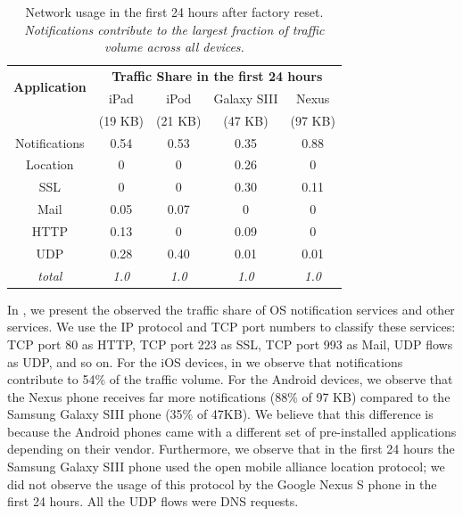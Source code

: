 \begin{table}
\begin{small}
\begin{tabular}{|c|c|c|c|c|}
\hline
\multirow{2}{*}{\bf Application} & \multicolumn{4}{c|}{\bf Traffic Share in the first 24 hours}\tabularnewline
\cline{2-5}
     & iPad & iPod & Galaxy SIII & Nexus \tabularnewline
     & (19 KB) & (21 KB) & (47 KB)& (97 KB)  \tabularnewline
\hline
Notifications & 0.54 & 0.53 & 0.35 & 0.88 \tabularnewline
\hline
Location & 0 & 0 & 0.26 & 0 \tabularnewline
\hline
SSL & 0 & 0 & 0.30 & 0.11 \tabularnewline
\hline
Mail & 0.05 & 0.07 & 0 & 0 \tabularnewline
\hline
HTTP & 0.13 & 0 & 0.09  & 0 \tabularnewline
\hline
UDP & 0.28 & 0.40 & 0.01 & 0.01 \tabularnewline
\hline
{\em total}& {\em 1.0} & {\em 1.0} & {\em 1.0} & {\em 1.0}\tabularnewline
\hline
\end{tabular}
\end{small}
\caption{Network usage in the first 24 hours after factory reset. \emph{Notifications contribute to the largest fraction of traffic volume across all devices.}}
\label{tab:traffic-share-factory-reset}
\end{table}

In , we present the observed the traffic share of OS notification services and other services. 
We use the IP protocol and TCP port numbers to classify these services: TCP port 80 as HTTP, TCP port 223 as SSL, TCP port 993 as Mail, UDP flows as UDP, and so on. 
For the iOS devices, in  we observe that notifications contribute to 54\% of the traffic volume.
For the Android devices, we observe that the Nexus phone receives far more notifications (88\% of 97 KB) compared to the Samsung Galaxy SIII phone (35\% of 47KB). 
We believe that this difference is because the Android phones came with a different set of pre-installed applications depending on their vendor. 
Furthermore, we observe that in the first 24 hours the Samsung Galaxy SIII phone used the open mobile alliance location protocol; we did not observe the usage of this protocol by the Google Nexus S phone in the first 24 hours. 
All the UDP flows were DNS requests.


